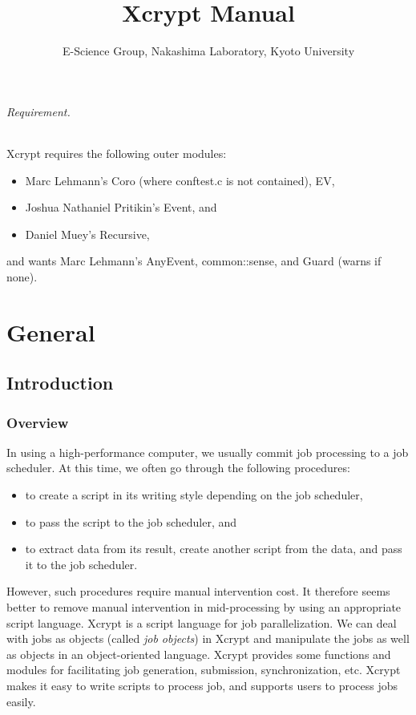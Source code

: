 \documentclass[a4paper,10pt]{report}
\title{Xcrypt Manual}
\author{E-Science Group, Nakashima Laboratory, Kyoto University}
\begin{document}
\maketitle
\tableofcontents

\paragraph{Requirement.}

Xcrypt requires the following outer modules:
\begin{itemize}
\item Marc Lehmann's Coro (where conftest.c is not contained), EV,
\item Joshua Nathaniel Pritikin's Event, and
\item Daniel Muey's Recursive,
\end{itemize}
and wants Marc Lehmann's AnyEvent, common::sense, and Guard (warns if
none).

\part{General}
\chapter{Introduction}

\section{Overview}

In using a high-performance computer, we usually commit job processing
to a job scheduler.  At this time, we often go through the following
procedures:
\begin{itemize}
\item to create a script in its writing style depending on the
      job scheduler,
\item to pass the script to the job scheduler, and
\item to extract data from its result, create another script from
      the data, and pass it to the job scheduler.
\end{itemize}

However, such procedures require manual intervention cost.  It
therefore seems better to remove manual intervention in mid-processing
by using an appropriate script language.  Xcrypt is a script language
for job parallelization.  We can deal with jobs as objects (called
\textit{job objects}) in Xcrypt and manipulate the jobs as well as
objects in an object-oriented language.  Xcrypt provides some
functions and modules for facilitating job generation, submission,
synchronization, etc.  Xcrypt makes it easy to write scripts to process
job, and supports users to process jobs easily.
\end{document}
